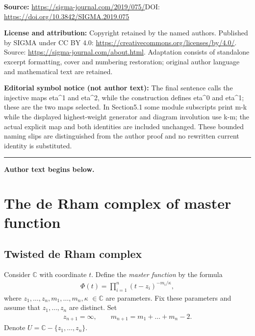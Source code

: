\documentclass[11pt]{article}
\numberwithin{equation}{section}
\begin{document}
\noindent\textbf{Source:} \url{https://sigma-journal.com/2019/075/}\quad DOI: \url{https://doi.org/10.3842/SIGMA.2019.075}\par
\noindent\textbf{License and attribution:} Copyright retained by the named authors. Published by SIGMA under CC BY 4.0: \url{https://creativecommons.org/licenses/by/4.0/}. Source: \url{https://sigma-journal.com/about.html}. Adaptation consists of standalone excerpt formatting, cover and numbering restoration; original author language and mathematical text are retained.\par
\noindent\textbf{Editorial symbol notice (not author text):} The final sentence calls the injective maps eta\textasciicircum{}1 and eta\textasciicircum{}2, while the construction defines eta\textasciicircum{}0 and eta\textasciicircum{}1; these are the two maps selected. In Section5.1 some module subscripts print m-k while the displayed highest-weight generator and diagram involution use k-m; the actual explicit map and both identities are included unchanged. These bounded naming slips are distinguished from the author proof and no rewritten current identity is substituted.\par
\medskip\hrule\medskip\noindent\textbf{Author text begins below.}\par
\setcounter{section}{1}
\setcounter{subsection}{0}
\setcounter{subsubsection}{0}
\setcounter{thm}{0}
\setcounter{equation}{0}
\section{The de Rham complex of master function} \label{sec DR}

\subsection{Twisted de Rham complex} \label{def dr}
Consider ${\mathbb C}$ with coordinate $t$. Define the {\it master function} by the formula
\begin{gather*}%
\Phi(t) = \prod_{i=1}^n (t-z_i)^{-m_i/\kappa} ,
\end{gather*}
where $z_1, \dots, z_n, m_1,\dots,m_n, \kappa$ $\in{\mathbb C}$ are parameters. Fix these parameters and assume that $z_1,\dots,z_n$ are distinct. Set
\begin{gather*}
z_{n+1}=\infty, \qquad m_{n+1}=m_1+\dots+m_n-2.
\end{gather*}
Denote $U={\mathbb C}-\{z_1,\dots,z_n\}$.
\end{document}
